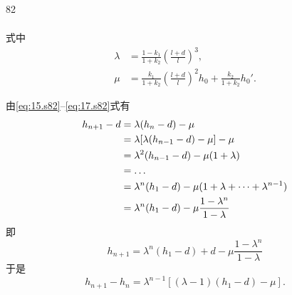 \begin{solution}{82}
\begin{subsolution}
\begin{subsubsolution}
\begin{subsubsubsolution}
\begin{subsubsubsubsolution}
\begin{align}
                        \label{eq:15.s82}
                    \end{align}
                    式中
                    \begin{align}
                        \lambda &= \frac{1-k_{1}}{1+k_{2}} \left(\frac{l+d}{l}\right)^{3},
                        \label{eq:16.s82}\\
                        \mu &= \frac{k_{1}}{1+k_{2}} \left(\frac{l+d}{l}\right)^{2} h_{0} + \frac{k_{2}}{1+k_{2}} h_{0}'.
                        \label{eq:17.s82}
                    \end{align}
                \end{subsubsubsubsolution}
                \begin{subsubsubsubsolution}
                    由\eqref{eq:15.s82}--\eqref{eq:17.s82}式有
                    \begin{align}
                        h_{n+1} - d &= \lambda (h_{n}-d) - \mu \notag\\
                        &= \lambda [ \lambda (h_{n-1}-d) - \mu ] - \mu \notag\\
                        &= \lambda^{2} (h_{n-1}-d) - \mu(1+\lambda) \notag\\
                        &= \dots \notag\\
                        &= \lambda^{n} (h_{1}-d) - \mu(1+\lambda+\dots+\lambda^{n-1}) \notag\\
                        &= \lambda^{n} (h_{1}-d) - \mu \frac{1-\lambda^{n}}{1-\lambda}
                        \label{eq:18.s82}
                    \end{align}
                    即
                    \begin{equation}
                        h_{n+1} = \lambda^{n} (h_{1}-d) + d - \mu \frac{1-\lambda^{n}}{1-\lambda}
                        \label{eq:19.s82}
                    \end{equation}
                    于是
                    \begin{equation}
                        h_{n+1} - h_{n} = \lambda^{n-1} [ (\lambda-1)(h_{1}-d) - \mu ].
                        \label{eq:20.s82}
                    \end{equation}
                \end{subsubsubsubsolution}
            \end{subsubsubsolution}
        \end{subsubsolution}
    \end{subsolution}
\end{solution}